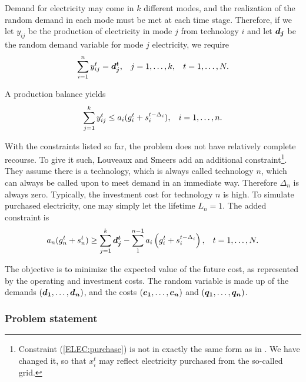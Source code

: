 Demand for electricity may come in $k$ different modes, and the realization of the random demand in each mode must be met at each time stage.  Therefore, if we let $y_{ij}$ be the production of electricity in mode $j$ from technology $i$ and let $\mathbf{\boldsymbol{d_j}}$ be the random demand variable for mode $j$ electricity, we require
\begin{equation*}
\sum_{i=1}^n y_{ij}^t = \mathbf{\boldsymbol{d_j^t}}, \hspace{3mm} j=1,\ldots,k, \hspace{3mm} t=1,\ldots,N.
\end{equation*}

A production balance yields
\begin{equation*}
\sum_{j=1}^k y_{ij}^t \leq a_i(g_i^t + s_i^{t-\Delta_i}), \hspace{3mm} i=1,\ldots,n.
\end{equation*}

With the constraints listed so far, the problem does not have relatively complete recourse.  To give it such, Louveaux and Smeers \cite{smeers88} add an additional constraint\footnote{Constraint (\ref{ELEC:purchase}) is not in exactly the same form as in \cite{smeers88}.  We have changed it, so that $x_i^t$ may reflect electricity purchased from the so-called grid.}.  They assume there is a technology, which is always called technology $n$, which can always be called upon to meet demand in an immediate way.  Therefore $\Delta_n$ is always zero.  Typically, the investment cost for technology $n$ is high.  To simulate purchased electricity, one may simply let the lifetime $L_n = 1$.  The added constraint is
\begin{equation}
\label{ELEC:purchase}
a_n(g_n^t + s_n^{t})\geq \sum_{j=1}^k \mathbf{\boldsymbol{d_j^t}} - \sum_{1}^{n-1}a_i\left( g_i^t + s_i^{t-\Delta_i}\right),\hspace{3mm} t=1,\ldots,N.
\end{equation}

The objective is to minimize the expected value of the future cost, as represented by the operating and investment costs.  The random variable is made up of the demands $(\mathbf{\boldsymbol{d_1}},\ldots,\mathbf{\boldsymbol{d_n}})$, and the costs $(\mathbf{\boldsymbol{c_1}}, \ldots, \mathbf{\boldsymbol{c_n}})$ and $(\mathbf{\boldsymbol{q_1}}, \ldots, \mathbf{\boldsymbol{q_n}})$.

\subsubsection{Problem statement}

